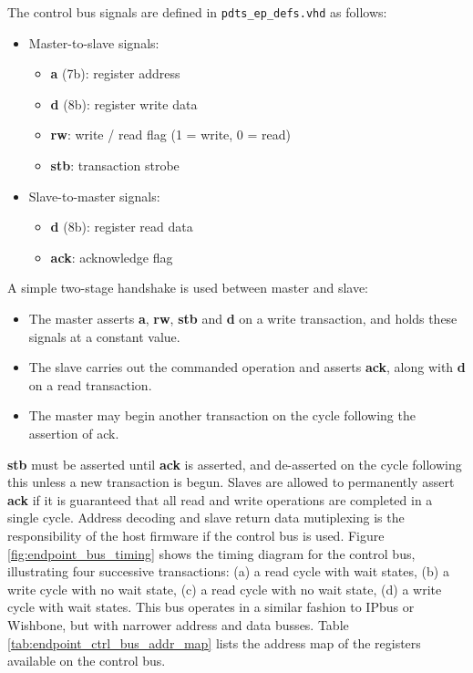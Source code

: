 \documentclass{article}
\begin{document}
The control bus signals are defined in \texttt{pdts\_ep\_defs.vhd} as follows:

\begin{itemize}
\item Master-to-slave signals:
\begin{itemize}
\item \textbf{a} (7b): register address
\item \textbf{d} (8b): register write data
\item \textbf{rw}: write / read flag (1 = write, 0 = read)
\item \textbf{stb}: transaction strobe
\end{itemize}

\item Slave-to-master signals:
\begin{itemize}
\item \textbf{d} (8b): register read data
\item \textbf{ack}: acknowledge flag
\end{itemize}

\end{itemize}

A simple two-stage handshake is used between master and slave:

\begin{itemize}
\item The master asserts \textbf{a}, \textbf{rw}, \textbf{stb} and \textbf{d} on a write transaction, and holds these signals at a constant value.
\item The slave carries out the commanded operation and asserts \textbf{ack}, along with \textbf{d} on a read transaction.
\item The master may begin another transaction on the cycle following the assertion of ack.
\end{itemize}

\textbf{stb} must be asserted until \textbf{ack} is asserted, and de-asserted on the cycle following this unless a new transaction is begun. Slaves are allowed to permanently assert \textbf{ack} if it is guaranteed that all read and write operations are completed in a single cycle. Address decoding and slave return data mutiplexing is the responsibility of the host firmware if the control bus is used. Figure \ref{fig:endpoint_bus_timing} shows the timing diagram for the control bus, illustrating four successive transactions: (a) a read cycle with wait states, (b) a write cycle with no wait state, (c) a read cycle with no wait state, (d) a write cycle with wait states. This bus operates in a similar fashion to IPbus or Wishbone, but with narrower address and data busses. Table \ref{tab:endpoint_ctrl_bus_addr_map} lists the address map of the registers available on the control bus.
\end{document}

